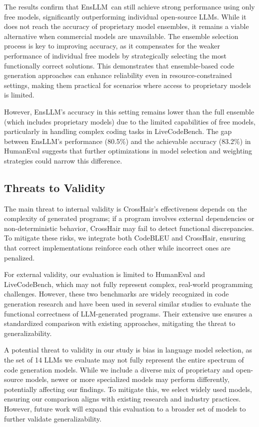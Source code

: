 \documentclass{article}
\newcommand{\tool}{EnsLLM}
\begin{document}
The results confirm that \tool\ can still achieve strong performance using only free models, significantly outperforming individual open-source LLMs. While it does not reach the accuracy of proprietary model ensembles, it remains a viable alternative when commercial models are unavailable. The ensemble selection process is key to improving accuracy, as it compensates for the weaker performance of individual free models by strategically selecting the most functionally correct solutions. This demonstrates that ensemble-based code generation approaches can enhance reliability even in resource-constrained settings, making them practical for scenarios where access to proprietary models is limited.

However, \tool's accuracy in this setting remains lower than the full ensemble (which includes proprietary models) due to the limited capabilities of free models, particularly in handling complex coding tasks in LiveCodeBench. The gap between \tool's performance (80.5\%) and the achievable accuracy (83.2\%) in HumanEval suggests that further optimizations in model selection and weighting strategies could narrow this difference.


\subsection{Threats to Validity}
The main threat to internal validity is CrossHair’s effectiveness depends on the complexity of generated programs; if a program involves external dependencies or non-deterministic behavior, CrossHair may fail to detect functional discrepancies. To mitigate these risks, we integrate both CodeBLEU and CrossHair, ensuring that correct implementations reinforce each other while incorrect ones are penalized.

For external validity, our evaluation is limited to HumanEval and LiveCodeBench, which may not fully represent complex, real-world programming challenges. However, these two benchmarks are widely recognized in code generation research and have been used in several similar studies to evaluate the functional correctness of LLM-generated programs. Their extensive use ensures a standardized comparison with existing approaches, mitigating the threat to generalizability. 

A potential threat to validity in our study is bias in language model selection, as the set of 14 LLMs we evaluate may not fully represent the entire spectrum of code generation models. While we include a diverse mix of proprietary and open-source models, newer or more specialized models may perform differently, potentially affecting our findings. To mitigate this, we select widely used models, ensuring our comparison aligns with existing research and industry practices. However, future work will expand this evaluation to a broader set of models to further validate generalizability.
\end{document}
